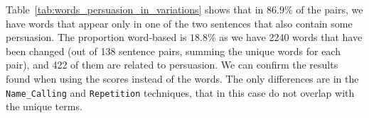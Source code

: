 Table~\ref{tab:words_persuasion_in_variations} shows that in $86.9\%$ of the pairs, we have words that appear only in one of the two sentences that also contain some persuasion. The proportion word-based is $18.8\%$ as we have 2240 words that have been changed (out of 138 sentence pairs, summing the unique words for each pair), and 422 of them are related to persuasion.
We can confirm the results found when using the scores instead of the words. The only differences are in the \texttt{Name\_Calling} and \texttt{Repetition} techniques, that in this case do not overlap with the unique terms.









